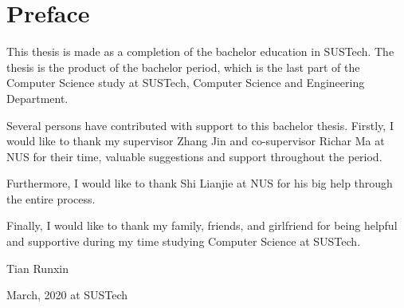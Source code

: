 \chapter{Preface}
\label{chap:chap-preface}
\vskip 28pt

This thesis is made as a completion of the bachelor education in SUSTech.
The thesis is the product of the bachelor period, which is the last part
of the Computer Science study at SUSTech, Computer Science and Engineering
Department.

Several persons have contributed with support to this bachelor thesis. 
Firstly, I would like to thank my supervisor Zhang Jin and co-supervisor
Richar Ma at NUS for their time, valuable suggestions and support throughout 
the period.

Furthermore, I would like to thank Shi Lianjie at NUS for his big help 
through the entire process.

Finally, I would like to thank my family, friends, and girlfriend for being
helpful and supportive during my time studying Computer Science at SUSTech.

\begin{flushright}

Tian Runxin

March, 2020 at SUSTech

\end{flushright}